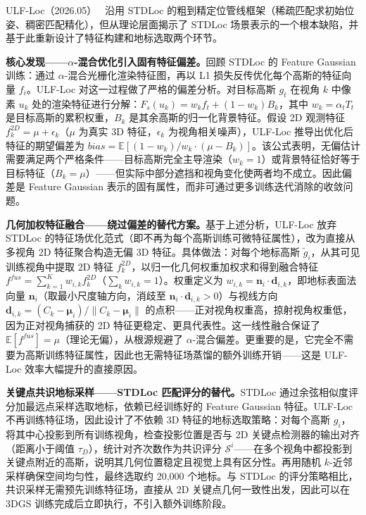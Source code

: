 ULF-Loc（2026.05）~\cite{2605_04730} 沿用 STDLoc 的粗到精定位管线框架（稀疏匹配求初始位姿、稠密匹配精化），但从理论层面揭示了 STDLoc 场景表示的一个根本缺陷，并基于此重新设计了特征构建和地标选取两个环节。

\textbf{核心发现——$\alpha$-混合优化引入固有特征偏差。}回顾 STDLoc 的 Feature Gaussian 训练：通过 $\alpha$-混合光栅化渲染特征图，再以 L1 损失反传优化每个高斯的特征向量 $f_i$。ULF-Loc 对这一过程做了严格的偏差分析。对目标高斯 $g_t$ 在视角 $k$ 中像素 $u_k$ 处的渲染特征进行分解：$F_s(u_k) = w_k f_t + (1 - w_k) B_k$，其中 $w_k = \alpha_t T_t$ 是目标高斯的累积权重，$B_k$ 是其余高斯的归一化背景特征。假设 2D 观测特征 $f_k^{2D} = \mu + \epsilon_k$（$\mu$ 为真实 3D 特征，$\epsilon_k$ 为视角相关噪声），ULF-Loc 推导出优化后特征的期望偏差为 $bias = \mathbb{E}[(1-w_k)/w_k \cdot (\mu - B_k)]$。该公式表明，无偏估计需要满足两个严格条件——目标高斯完全主导渲染（$w_k = 1$）或背景特征恰好等于目标特征（$B_k = \mu$）——但实际中部分遮挡和视角变化使两者均不成立。因此偏差是 Feature Gaussian 表示的固有属性，而非可通过更多训练迭代消除的收敛问题。

\textbf{几何加权特征融合——绕过偏差的替代方案。}基于上述分析，ULF-Loc 放弃 STDLoc 的特征场优化范式（即不再为每个高斯训练可微特征属性），改为直接从多视角 2D 特征聚合构造无偏 3D 特征。具体做法：对每个地标高斯 $\tilde{g}_i$，从其可见训练视角中提取 2D 特征 $f_k^{2D}$，以归一化几何权重加权求和得到融合特征 $f^{fus} = \sum_{k=1}^{K} w_{i,k} f_k^{2D}$（$\sum_k w_{i,k} = 1$）。权重定义为 $w_{i,k} = \bm{n}_i \cdot \bm{d}_{i,k}$，即地标表面法向量 $\bm{n}_i$（取最小尺度轴方向，消歧至 $\bm{n}_i \cdot \bm{d}_{i,k} > 0$）与视线方向 $\bm{d}_{i,k} = (C_k - \bm{\mu}_i)/\|C_k - \bm{\mu}_i\|$ 的点积——正对视角权重高，掠射视角权重低，因为正对视角捕获的 2D 特征更稳定、更具代表性。这一线性融合保证了 $\mathbb{E}[f^{fus}] = \mu$（理论无偏），从根源规避了 $\alpha$-混合偏差。更重要的是，它完全不需要为高斯训练特征属性，因此也无需特征场蒸馏的额外训练开销——这是 ULF-Loc 效率大幅提升的直接原因。

\textbf{关键点共识地标采样——STDLoc 匹配评分的替代。}STDLoc 通过余弦相似度评分加最远点采样选取地标，依赖已经训练好的 Feature Gaussian 特征。ULF-Loc 不再训练特征场，因此设计了不依赖 3D 特征的地标选取策略：对每个高斯 $g_i$，将其中心投影到所有训练视角，检查投影位置是否与 2D 关键点检测器的输出对齐（距离小于阈值 $\tau_D$），统计对齐次数作为共识评分 $\mathcal{S}^i$——在多个视角中都投影到关键点附近的高斯，说明其几何位置稳定且视觉上具有区分性。再用随机 $k$-近邻采样确保空间均匀性，最终选取约 20,000 个地标。与 STDLoc 的评分策略相比，共识采样无需预先训练特征场，直接从 2D 关键点几何一致性出发，因此可以在 3DGS 训练完成后立即执行，不引入额外训练阶段。


